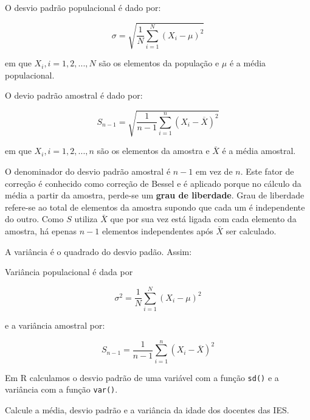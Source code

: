 \documentclass[12pt,]{style/krantz}
\makeatletter
\newenvironment{Shaded}{\begin{snugshade}}{\end{snugshade}}
\newcommand{\DataTypeTok}[1]{\textcolor[rgb]{0.13,0.29,0.53}{#1}}
\newcommand{\KeywordTok}[1]{\textcolor[rgb]{0.13,0.29,0.53}{\textbf{#1}}}
\newcommand{\NormalTok}[1]{#1}
\newcommand{\OperatorTok}[1]{\textcolor[rgb]{0.81,0.36,0.00}{\textbf{#1}}}
\newcommand{\StringTok}[1]{\textcolor[rgb]{0.31,0.60,0.02}{#1}}
\renewenvironment{quote}{\begin{VF}}{\end{VF}}
\newenvironment{kframe}{%
\medskip{}
\setlength{\fboxsep}{.8em}
 \def\at@end@of@kframe{}%
 \ifinner\ifhmode%
  \def\at@end@of@kframe{\end{minipage}}%
  \begin{minipage}{\columnwidth}%
 \fi\fi%
 \def\FrameCommand##1{\hskip\@totalleftmargin \hskip-\fboxsep
 \colorbox{shadecolor}{##1}\hskip-\fboxsep
     \hskip-\linewidth \hskip-\@totalleftmargin \hskip\columnwidth}%
 \MakeFramed {\advance\hsize-\width
   \@totalleftmargin\z@ \linewidth\hsize
   \@setminipage}}%
 {\par\unskip\endMakeFramed%
 \at@end@of@kframe}
\renewenvironment{Shaded}{\begin{kframe}}{\end{kframe}}
\theoremstyle{definition}
\theoremstyle{definition}
\theoremstyle{definition}
\theoremstyle{remark}
\let\BeginKnitrBlock\begin \let\EndKnitrBlock\end
\makeatother
\begin{document}
O desvio padrão populacional é dado por:

\[{\displaystyle \sigma ={\sqrt {{\frac {1}{N}}\sum _{i=1}^{N}(X_{i}-\mu )^{2}}}}\]

em que \(X_i,i=1,2,...,N\) são os elementos da população e \(\mu\) é a média populacional.

O devio padrão amostral é dado por:

\[{\displaystyle S_{n-1}={\sqrt {{\frac {1}{n-1}}\sum _{i=1}^{n}(X_{i}-{\overline {X}})^{2}}}}\]

em que \(X_i,i=1,2,...,n\) são os elementos da amostra e \(\bar X\) é a média amostral.

\begin{quote}
O denominador do desvio padrão amostral é \(n-1\) em vez de \(n\). Este fator de correção é conhecido como correção de Bessel \citep{reichmann1961use} e é aplicado porque no cálculo da média a partir da amostra, perde-se um \textbf{grau de liberdade}. Grau de liberdade refere-se ao total de elementos da amostra supondo que cada um é independente do outro. Como \(S\) utiliza \(\bar X\) que por sua vez está ligada com cada elemento da amostra, há epenas \(n-1\) elementos independentes após \(\bar X\) ser calculado.
\end{quote}

A variância é o quadrado do desvio padão. Assim:

Variância populacional é dada por

\[\sigma^2 ={{\frac {1}{N}}\sum _{i=1}^{N}(X_{i}-\mu )^{2}}\]

e a variância amostral por:

\[S_{n-1}={{\frac {1}{n-1}}\sum _{i=1}^{n}(X_{i}-{\overline {X}})^{2}}\]

Em R calculamos o desvio padrão de uma variável com a função \texttt{sd()} e a variância com a função \texttt{var()}.

\BeginKnitrBlock{example}
\protect\hypertarget{exm:unnamed-chunk-46}{}{\label{exm:unnamed-chunk-46} }Calcule a média, desvio padrão e a variância da idade dos docentes das IES.
\EndKnitrBlock{example}

\begin{Shaded}
\end{Shaded}
\end{document}
